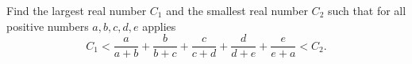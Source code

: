 Find the largest real number $C_1$ and the smallest real number $C_2$ such that
for all positive numbers $a,b,c,d,e$ applies
$$C_1<\frac{a}{a+b}+\frac{b}{b+c}+\frac{c}{c+d}+\frac{d}{d+e}+\frac{e}{e+a}<C_2.$$